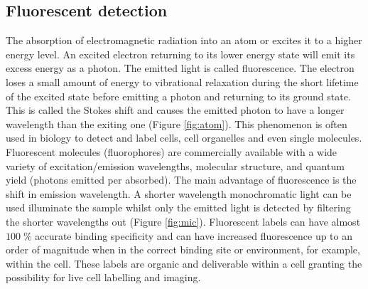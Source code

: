 \documentclass[final]{jyflluk}
\begin{document}
\subsection{Fluorescent detection}
\label{sec:x2}
The absorption of electromagnetic radiation into an atom or excites it to a higher energy level. An excited electron returning to its lower energy state will emit its excess energy as a photon. The emitted light is called fluorescence. The electron loses a small amount of energy to vibrational relaxation during the short lifetime of the excited state before emitting a photon and returning to its ground state. This is called the Stokes shift and causes the emitted photon to have a longer wavelength than the exiting one (Figure \ref{fig:atom}). This phenomenon is often used in biology to detect and label cells, cell organelles and even single molecules. Fluorescent molecules (fluorophores) are commercially available with a wide variety of excitation/emission wavelengths, molecular structure, and quantum yield (photons emitted per absorbed). The main advantage of fluorescence is the shift in emission wavelength. A shorter wavelength monochromatic light can be used illuminate the sample whilst only the emitted light is detected by filtering the shorter wavelengths out (Figure \ref{fig:mic}). Fluorescent labels can have almost $100 \; \percent$ accurate binding specificity and can have increased fluorescence up to an order of magnitude when in the correct binding site or environment, for example, within the cell. These labels are organic and deliverable within a cell granting the possibility for live cell labelling and imaging. \cite{toseland2013fluorescent}
 
\end{document}
